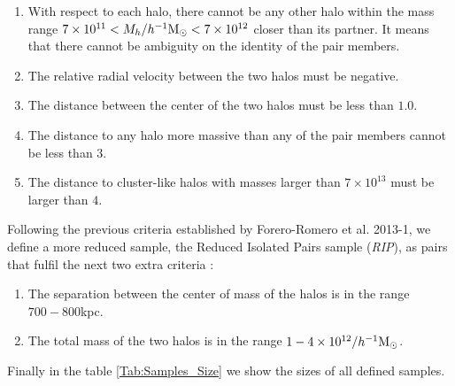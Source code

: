 \documentclass[usenatbib]{latex/mn2e}
\begin{document}
\begin{enumerate}

\item{With respect to each halo, there cannot be any other halo within the 
mass range $7\times10^{11} < M_{h}/\hMsun < 7\times 10^{12}$ closer than 
its partner. It means that there cannot be ambiguity on the identity of
the pair members.}

\item{The relative radial velocity between the two halos must be 
negative.}

\item{The distance between the center of the two halos must be less than 
$1.0$\hMpc.}

\item{The distance to any halo more massive than any of the pair members 
cannot be less than $3$\hMpc.}

\item{The distance to cluster-like halos with masses larger than 
$7\times10^{13}$ \hMsun must be larger than $4$\hMpc.}
\end{enumerate}



Following the previous criteria established by Forero-Romero et al. 2013-1,
we define a more reduced sample, the Reduced Isolated Pairs sample 
(\textit{RIP}), as pairs that fulfil the next two extra criteria :



\begin{enumerate}

\item{The separation between the center of mass of the halos is in the 
range $700-800$kpc.}

\item{The total mass of the two halos is in the range 
$1-4\times 10^{12}/\hMsun$.}

\end{enumerate}


Finally in the table \ref{Tab:Samples_Size} we show the sizes of all 
defined samples.
\end{document}
